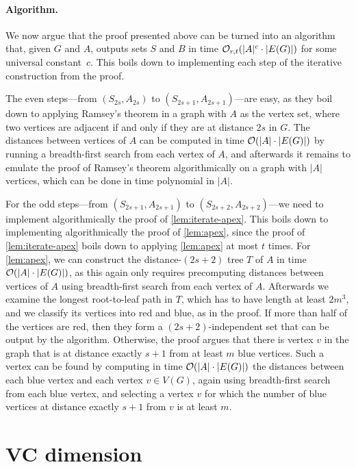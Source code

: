 \paragraph{Algorithm.} We now argue that the proof presented above can be turned into an algorithm that, 
given $G$ and $A$, outputs sets $S$ and $B$ in time $\mathcal{O}_{r,t}(|A|^c\cdot |E(G)|)$ for some universal constant~$c$.
This boils down to implementing each step of the iterative construction from the proof.

The even steps---from $(S_{2s},A_{2s})$ to $(S_{2s+1},A_{2s+1})$---are easy, as they boil down to applying Ramsey's theorem in a graph with $A$ as the vertex set, where two vertices are adjacent if and only
if they are at distance $2s$ in $G$. The distances between vertices of $A$ can be computed in time $\mathcal{O}(|A|\cdot |E(G)|)$ by running a breadth-first search from each vertex of $A$, and afterwards it remains
to emulate the proof of Ramsey's theorem algorithmically on a graph with $|A|$ vertices, which can be done in time polynomial in $|A|$.

For the odd steps---from $(S_{2s+1},A_{2s+1})$ to $(S_{2s+2},A_{2s+2})$---we need to implement algorithmically the proof of \cref{lem:iterate-apex}. 
This boils down to implementing algorithmically the proof of \cref{lem:apex}, since
the proof of \cref{lem:iterate-apex} boils down to applying \cref{lem:apex} at most $t$ times. For \cref{lem:apex}, we can construct the distance-$(2s+2)$ tree $T$ of $A$ in time
$\mathcal{O}(|A|\cdot |E(G)|)$, as this again only requires precomputing distances between vertices of $A$ using breadth-first search from each vertex of $A$.
Afterwards we examine the longest root-to-leaf path in $T$, which has to have length at least $2m^3$, and we classify its vertices into red and blue, as in the proof. If more than half of the vertices are red,
then they form a $(2s+2)$-independent set that can be output by the algorithm. Otherwise, the proof argues that there is vertex $v$ in the graph that is at distance exactly $s+1$ from at least $m$ blue vertices.
Such a vertex can be found by computing in time $\mathcal{O}(|A|\cdot |E(G)|)$ the distances between each blue vertex and each vertex $v\in V(G)$, again using breadth-first search from each blue vertex, and selecting
a vertex $v$ for which the number of blue vertices at distance exactly $s+1$ from $v$ is at least $m$.

\section{VC dimension}\label{sec:vc}

